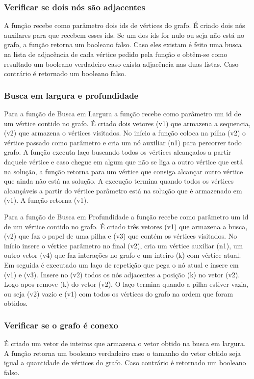 \documentclass[a4paper, 12pt]{article}
\begin{document}
\subsubsection{Verificar se dois nós são adjacentes}
A função recebe como parâmetro dois ids de vértices do grafo. É criado dois nós auxilares para que recebem esses ids. Se um dos ids for nulo ou seja não está no grafo, a função retorna um booleano falso. Caso eles existam é feito uma busca na lista de adjacência de cada vértice pedido pela função e obtêm-se como resultado um booleano verdadeiro caso exista adjacência nas duas listas. Caso contrário é retornado um booleano falso.


\subsubsection{Busca em largura e profundidade}
Para a função de Busca em Largura a função recebe como parâmetro um id de um vértice contido no grafo. É criado dois vetores (v1) que armazena a sequencia, (v2) que armazena o vértices visitados. No início a função coloca na pilha (v2) o vértice passado como parâmetro e cria um nó auxiliar (n1) para percorrer todo grafo. A função executa laço buscando todos os vértices alcançados a partir daquele vértice e caso chegue em algum que não se liga a outro vértice que está na solução, a função retorna para um vértice que consiga alcançar outro vértice que ainda não está na solução. A execução termina quando todos os vértices alcançáveis a partir do vértice parâmetro está na solução que é armazenado em (v1). A função retorna (v1).  

Para a função de Busca em Profundidade a função recebe como parâmetro um id de um vértice contido no grafo. É criado três vetores (v1) que armazena a busca, (v2) que faz o papel de uma pilha e (v3) que contém os vértices visitados. No início insere o vértice parâmetro no final (v2), cria um vértice auxiliar (n1), um outro vetor (v4) que faz interações no grafo e um inteiro (k) com vértice atual. Em seguida é executado um laço de repetição que pega o nó atual e insere em (v1) e (v3). Insere no (v2) todos os nós adjacentes a posição (k) no vetor (v2). Logo apos remove (k) do vetor (v2). O laço termina quando a pilha estiver vazia, ou seja (v2) vazio e (v1) com todos os vértices do grafo na ordem que foram obtidos.

\subsubsection{Verificar se o grafo é conexo}
É criado um vetor de inteiros que armazena o vetor obtido na busca em largura. A função retorna um booleano verdadeiro caso o tamanho do vetor obtido seja igual a quantidade de vértices do grafo. Caso contrário é retornado um booleano falso.
\end{document}
